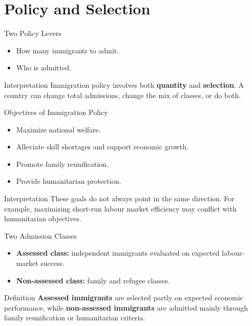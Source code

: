 \documentclass[aspectratio=169]{beamer}
\begin{document}
\section{Policy and Selection}

\begin{frame}{Two Policy Levers}
\transfade
\begin{itemize}
  \item How many immigrants to admit.
  \item Who is admitted.
\end{itemize}

\begin{block}{Interpretation}
Immigration policy involves both \textbf{quantity} and \textbf{selection}. A country can change total admissions, change the mix of classes, or do both.
\end{block}
\end{frame}

\begin{frame}{Objectives of Immigration Policy}
\transfade
\begin{itemize}
  \item Maximize national welfare.
  \item Alleviate skill shortages and support economic growth.
  \item Promote family reunification.
  \item Provide humanitarian protection.
\end{itemize}

\begin{block}{Interpretation}
These goals do not always point in the same direction. For example, maximizing short-run labour market efficiency may conflict with humanitarian objectives.
\end{block}
\end{frame}

\begin{frame}{Two Admission Classes}
\transfade
\begin{itemize}
  \item \textbf{Assessed class:} independent immigrants evaluated on expected labour-market success.
  \item \textbf{Non-assessed class:} family and refugee classes.
\end{itemize}

\begin{block}{Definition}
\textbf{Assessed immigrants} are selected partly on expected economic performance, while \textbf{non-assessed immigrants} are admitted mainly through family reunification or humanitarian criteria.
\end{block}
\end{frame}
\end{document}
